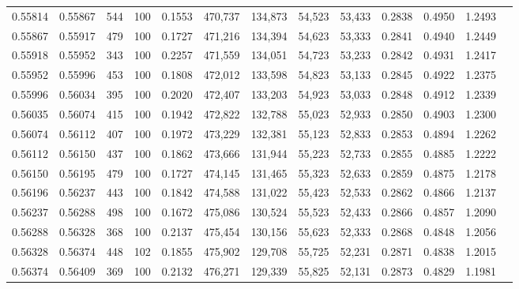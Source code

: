\begin{tabular}{rrrrrrrrrrrrr}
0.55814 & 0.55867 &   544 & 100 &                                     0.1553 & 470,737 & 134,873 &  54,523 &  53,433 & 0.2838 & 0.4950 & 1.2493 \\
0.55867 & 0.55917 &   479 & 100 &                                     0.1727 & 471,216 & 134,394 &  54,623 &  53,333 & 0.2841 & 0.4940 & 1.2449 \\
0.55918 & 0.55952 &   343 & 100 &                                     0.2257 & 471,559 & 134,051 &  54,723 &  53,233 & 0.2842 & 0.4931 & 1.2417 \\
0.55952 & 0.55996 &   453 & 100 &                                     0.1808 & 472,012 & 133,598 &  54,823 &  53,133 & 0.2845 & 0.4922 & 1.2375 \\
0.55996 & 0.56034 &   395 & 100 &                                     0.2020 & 472,407 & 133,203 &  54,923 &  53,033 & 0.2848 & 0.4912 & 1.2339 \\
0.56035 & 0.56074 &   415 & 100 &                                     0.1942 & 472,822 & 132,788 &  55,023 &  52,933 & 0.2850 & 0.4903 & 1.2300 \\
0.56074 & 0.56112 &   407 & 100 &                                     0.1972 & 473,229 & 132,381 &  55,123 &  52,833 & 0.2853 & 0.4894 & 1.2262 \\
0.56112 & 0.56150 &   437 & 100 &                                     0.1862 & 473,666 & 131,944 &  55,223 &  52,733 & 0.2855 & 0.4885 & 1.2222 \\
0.56150 & 0.56195 &   479 & 100 &                                     0.1727 & 474,145 & 131,465 &  55,323 &  52,633 & 0.2859 & 0.4875 & 1.2178 \\
0.56196 & 0.56237 &   443 & 100 &                                     0.1842 & 474,588 & 131,022 &  55,423 &  52,533 & 0.2862 & 0.4866 & 1.2137 \\
0.56237 & 0.56288 &   498 & 100 &                                     0.1672 & 475,086 & 130,524 &  55,523 &  52,433 & 0.2866 & 0.4857 & 1.2090 \\
0.56288 & 0.56328 &   368 & 100 &                                     0.2137 & 475,454 & 130,156 &  55,623 &  52,333 & 0.2868 & 0.4848 & 1.2056 \\
0.56328 & 0.56374 &   448 & 102 &                                     0.1855 & 475,902 & 129,708 &  55,725 &  52,231 & 0.2871 & 0.4838 & 1.2015 \\
0.56374 & 0.56409 &   369 & 100 &                                     0.2132 & 476,271 & 129,339 &  55,825 &  52,131 & 0.2873 & 0.4829 & 1.1981 \\

\end{tabular}

